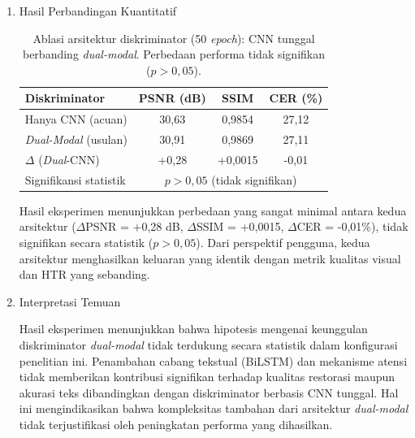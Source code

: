 \documentclass[12pt,a4paper]{article}
\begin{document}
\begin{enumerate}[leftmargin=1.5em, labelsep=0.5em, itemindent=0pt, noitemsep, topsep=0pt]
    \item Hasil Perbandingan Kuantitatif
          \begin{table}[!htbp]
              \caption[Ablasi diskriminator dual-modal berbanding CNN]{Ablasi arsitektur diskriminator (50 \textit{epoch}): CNN tunggal berbanding \textit{dual-modal}. Perbedaan performa tidak signifikan ($p>0,05$).}
              \label{tab:diskriminator-ablasi}
              \small
              \begin{tabularx}{\textwidth}{|>{\raggedright\arraybackslash}X|c|c|c|}
                  \hline
                  \textbf{Diskriminator}                & \textbf{PSNR (dB)}                                         & \textbf{SSIM}    & \textbf{CER (\%)} \\
                  \hline
                  Hanya CNN (acuan)         & 30,63                                             & 0,9854  & 27,12    \\
                  \textit{Dual-Modal} (usulan)        & 30,91                                             & 0,9869  & 27,11    \\
                  \hline
                  $\Delta$ (\textit{Dual}-CNN) & +0,28                                             & +0,0015 & -0,01    \\
                  Signifikansi statistik       & \multicolumn{3}{c|}{$p > 0,05$ (tidak signifikan)}                      \\
                  \hline
              \end{tabularx}
          \end{table}
          \noindent Hasil eksperimen menunjukkan perbedaan yang sangat minimal antara kedua arsitektur ($\Delta$PSNR = +0,28 dB, $\Delta$SSIM = +0,0015, $\Delta$CER = -0,01\%), tidak signifikan secara statistik ($p > 0,05$). Dari perspektif pengguna, kedua arsitektur menghasilkan keluaran yang identik dengan metrik kualitas visual dan HTR yang sebanding.

    \item Interpretasi Temuan

          Hasil eksperimen menunjukkan bahwa hipotesis mengenai keunggulan diskriminator \textit{dual-modal} tidak terdukung secara statistik dalam konfigurasi penelitian ini. Penambahan cabang tekstual (BiLSTM) dan mekanisme atensi tidak memberikan kontribusi signifikan terhadap kualitas restorasi maupun akurasi teks dibandingkan dengan diskriminator berbasis CNN tunggal. Hal ini mengindikasikan bahwa kompleksitas tambahan dari arsitektur \textit{dual-modal} tidak terjustifikasi oleh peningkatan performa yang dihasilkan.


\end{enumerate}
\end{document}
